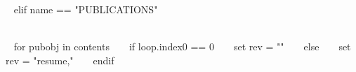 


~{ elif name == "PUBLICATIONS" }~

\needspace{\headerpush}
\myRule{\columnwidth}{1pt}\\


~{ for pubobj in contents }~ 
~{ if loop.index0 == 0 }~ 
	~{ set rev = "" }~
~{ else }~
	~{ set rev = "resume," }~
~{ endif }~
